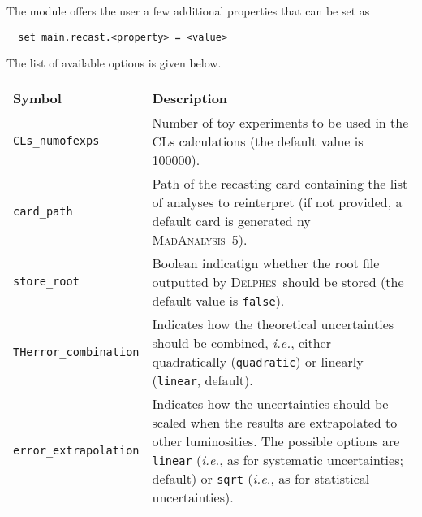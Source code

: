 \documentclass[a4paper]{article}
\newcommand{\MA}{\textsc{MadAnalysis}~5}
\newcommand{\DEL}{\textsc{Delphes}}
\newcommand{\ie}{\textit{i.e.}}
\begin{document}
\noindent The module offers the user a few additional properties that can be set
as
{\color{ao} \begin{verbatim}
  set main.recast.<property> = <value>
\end{verbatim}}
The list of available options is given below.
\renewcommand{\arraystretch}{1.2}%
\begin{center}\begin{tabular}{l p{8.4cm}}
\hline
  Symbol& Description\\
  \hline
  \color{ao} \verb?CLs_numofexps? & Number of toy experiments to be used in the
    CLs calculations (the default value is 100000). \\
  \color{ao} \verb?card_path?     & Path of the recasting card containing the
    list of analyses to reinterpret (if not provided, a default card is
    generated ny \MA).\\
  \color{ao} \verb?store_root?    & Boolean indicatign whether the root file
    outputted by \DEL\ should be stored (the default value is \verb|false|).\\
  \color{ao} \verb?THerror_combination? & Indicates how the theoretical
    uncertainties should be combined, \ie, either quadratically
    (\verb|quadratic|) or linearly (\verb|linear|, default).\\
  \color{ao} \verb?error_extrapolation? & Indicates how the uncertainties should
    be scaled when the results are extrapolated to other luminosities. The
    possible options are \verb|linear| (\ie, as for systematic uncertainties;
    default) or \verb|sqrt| (\ie, as for statistical uncertainties).\\
\hline
\end{tabular}
\end{center}




\newpage
 

\end{document}
